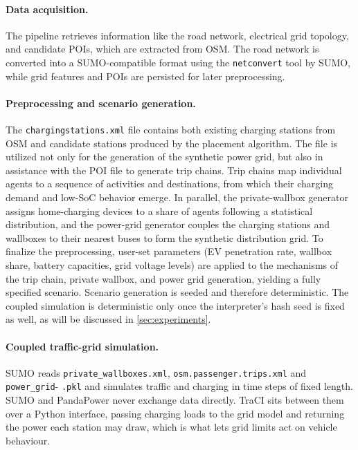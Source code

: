 \paragraph{Data acquisition.}
The pipeline retrieves information like the road network, electrical grid topology, and candidate \acp{POI}, which are extracted from \ac{OSM}. The road network is converted into a SUMO-compatible format using the \texttt{netconvert} tool by \ac{SUMO}, while grid features and POIs are persisted for later preprocessing. 

\paragraph{Preprocessing and scenario generation.}
The \texttt{chargingstations.xml} file contains both existing charging stations from \ac{OSM} and candidate stations produced by the placement algorithm. The file is utilized not only for the generation of the synthetic power grid, but also in assistance with the \ac{POI} file to generate trip chains. Trip chains map individual agents to a sequence of activities and destinations, from which their charging demand and low-\ac{SoC} behavior emerge. In parallel, the private-wallbox generator assigns home-charging devices to a share of agents following a statistical distribution, and the power-grid generator couples the charging stations and wallboxes to their nearest buses to form the synthetic distribution grid. To finalize the preprocessing, user-set parameters (\ac{EV} penetration rate, wallbox share, battery capacities, grid voltage levels) are applied to the mechanisms of the trip chain, private wallbox, and power grid generation, yielding a fully specified scenario. Scenario generation is seeded and therefore deterministic. The coupled simulation is deterministic only once the interpreter's hash seed is fixed as well, as will be discussed in \cref{sec:experiments}.


\paragraph{Coupled traffic-grid simulation.} SUMO reads \texttt{private\_wallboxes.xml}, \texttt{osm.passenger.trips.xml} and \texttt{power\_grid}- \texttt{.pkl} and simulates traffic and charging in time steps of fixed length. SUMO and PandaPower never exchange data directly. TraCI sits between them over a Python interface, passing charging loads to the grid model and returning the power each station may draw, which is what lets grid limits act on vehicle behaviour.


